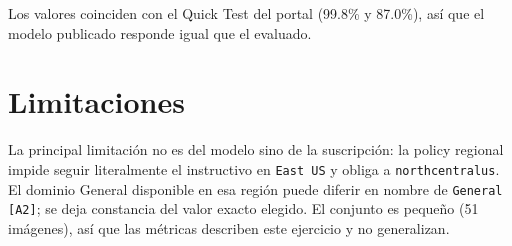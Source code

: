 \documentclass[10pt,journal]{IEEEtran}
\begin{document}
  Los valores coinciden con el Quick Test del portal (99.8\% y 87.0\%), as\'i que el modelo publicado responde igual que el evaluado.

  \section{Limitaciones}

  La principal limitaci\'on no es del modelo sino de la suscripci\'on: la policy regional impide seguir literalmente el instructivo en \texttt{East US} y obliga a \texttt{northcentralus}. El dominio General disponible en esa regi\'on puede diferir en nombre de \texttt{General [A2]}; se deja constancia del valor exacto elegido. El conjunto es peque\~no (51 im\'agenes), as\'i que las m\'etricas describen este ejercicio y no generalizan.

  
  
\end{document}
